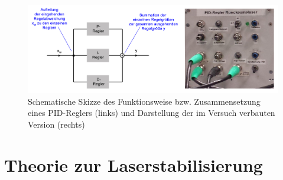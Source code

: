 \documentclass[
class=book,
accentcolor=1b,
custommargins=geometry,
fontsize=11pt,
thesis={type=Versuchsanleitung},
ruledheaders=all,
headline=false,
instbox=false,
marginpar=false,
title=small,
ignore-missing-data=true,
twoside=false,
logofile=apqdesign/tuda_logo.pdf,
pdfa=false %
]{apqpub}
\begin{document}
			\begin{figure}[htb!]
				\centering
				\includegraphics[width=\textwidth]{graphics/PID.jpg}
				\caption{Schematische Skizze des Funktionsweise bzw. Zusammensetzung eines PID-Reglers (links)
					und Darstellung der im Versuch verbauten Version (rechts)}
				\label{fig:PID}
			\end{figure}
			
			\chapter{Theorie zur Laserstabilisierung}
			
\end{document}

